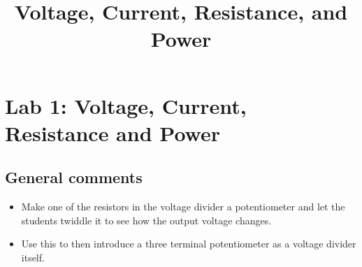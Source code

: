 \documentclass{article}
\title{Voltage, Current, Resistance, and Power}
\begin{document}
\maketitle

\section{Lab 1: Voltage, Current, Resistance and Power}

\subsection*{General comments}

\begin{itemize}
\item Make one of the resistors in the voltage divider a potentiometer and let the students twiddle it to see how the output voltage changes.
\item Use this to then introduce a three terminal potentiometer as a voltage divider itself.
\end{itemize}
\end{document}
